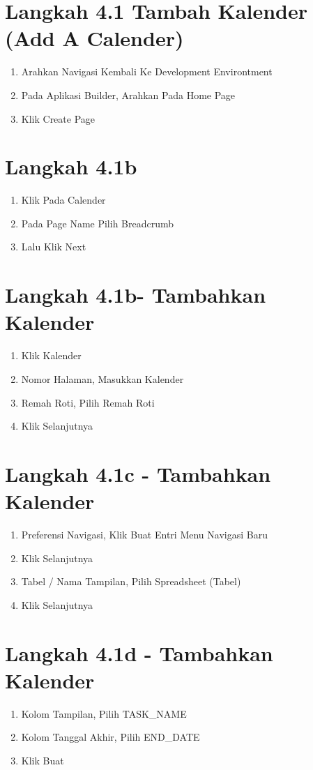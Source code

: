 \documentclass{article}
\begin{document}
\section{Langkah 4.1 Tambah Kalender (Add A Calender)}
\begin{enumerate}
    \item Arahkan Navigasi Kembali Ke Development Environtment
    \item Pada Aplikasi Builder, Arahkan Pada Home Page
    \item Klik Create Page

\end{enumerate}
\section{Langkah 4.1b}
\begin{enumerate}
    \item Klik Pada Calender
    \item Pada Page Name Pilih Breadcrumb
    \item Lalu Klik Next

\end{enumerate}
\section{Langkah 4.1b- Tambahkan Kalender}
\begin{enumerate}
    \item Klik Kalender
    \item Nomor Halaman, Masukkan Kalender
    \item Remah Roti, Pilih Remah Roti
    \item Klik Selanjutnya

\end{enumerate}
\section{Langkah 4.1c - Tambahkan Kalender}
\begin{enumerate}
    \item Preferensi Navigasi, Klik Buat Entri Menu Navigasi Baru
    \item Klik Selanjutnya
    \item Tabel / Nama Tampilan, Pilih Spreadsheet (Tabel)
    \item Klik Selanjutnya


\end{enumerate}
\section{Langkah 4.1d - Tambahkan Kalender}
\begin{enumerate}
    \item Kolom Tampilan, Pilih TASK_NAME
    \item Kolom Tanggal Akhir, Pilih END_DATE
    \item Klik Buat

\end{enumerate}
\end{document}
